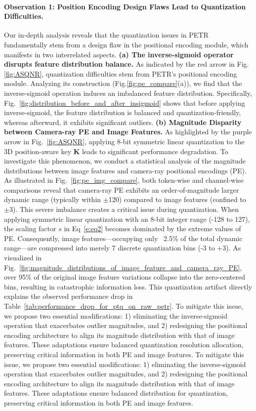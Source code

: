 \paragraph{Observation 1: Position Encoding Design Flaws Lead to Quantization Difficulties.}
Our in-depth analysis reveals that the quantization issues in PETR fundamentally stem from a design flaw in the positional encoding module, which manifests in two interrelated aspects. \textbf{(a) The inverse-sigmoid operator disrupts feature distribution balance.} As indicated by the red arrow in Fig.\ref{fig:ASQNR}, quantization difficulties stem from PETR's positional encoding module. Analyzing its construction (Fig.\ref{fig:pe_compare}(a)), we find that the inverse-sigmoid operation induces an imbalanced feature distribution. Specifically, Fig.~\ref{fig:distribution_before_and_after_insigmoid} shows that before applying inverse-sigmoid, the feature distribution is balanced and quantization-friendly, whereas afterward, it exhibits significant outliers. \textbf{(b) Magnitude Disparity between Camera-ray PE and Image Features.} As highlighted by the purple arrow in Fig.~\ref{fig:ASQNR}, applying 8-bit symmetric linear quantization to the 3D position-aware key $\mathbf{K}$ leads to significant performance degradation. To investigate this phenomenon, we conduct a statistical analysis of the magnitude distributions between image features and camera-ray positional encodings (PE). As illustrated in Fig.~\ref{fig:pe_img_compare}, both token-wise and channel-wise comparisons reveal that camera-ray PE exhibits an order-of-magnitude larger dynamic range (typically within $\pm$120) compared to image features (confined to $\pm$3). This severe imbalance creates a critical issue during quantization. When applying symmetric linear quantization with an 8-bit integer range (-128 to 127), the scaling factor \( s \) in Eq~\ref{e:eq2} becomes dominated by the extreme values of PE. Consequently, image features---occupying only ~2.5\% of the total dynamic range—are compressed into merely 7 discrete quantization bins (-3 to +3). As visualized in Fig.~\ref{fig:magnitude_distributions_of_image_feature_and_camera_ray_PE}, over 95\% of the original image feature variations collapse into the zero-centered bins, resulting in catastrophic information loss. This quantization artifact directly explains the observed performance drop in Table~\ref{tab:performance_drop_for_ptq_on_raw_petr}. To mitigate this issue, we propose two essential modifications: 1) eliminating the inverse-sigmoid operation that exacerbates outlier magnitudes, and 2) redesigning the positional encoding architecture to align its magnitude distribution with that of image features. These adaptations ensure balanced quantization resolution allocation, preserving critical information in both PE and image features. To mitigate this issue, we propose two essential modifications: 1) eliminating the inverse-sigmoid operation that exacerbates outlier magnitudes, and 2) redesigning the positional encoding architecture to align its magnitude distribution with that of image features. These adaptations ensure balanced distribution for quantization, preserving critical information in both PE and image features.
